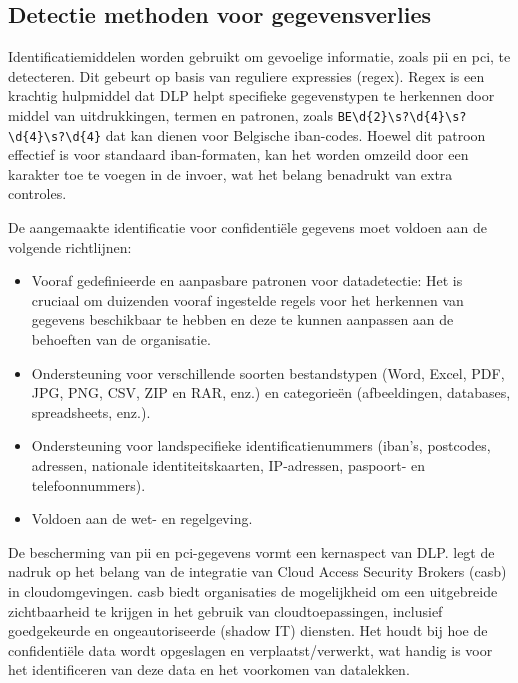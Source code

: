 \subsection{Detectie methoden voor gegevensverlies}

Identificatiemiddelen worden gebruikt om gevoelige informatie, zoals \gls{pii} en \gls{pci}, te detecteren. 
Dit gebeurt op basis van reguliere expressies (regex). 
Regex is een krachtig hulpmiddel dat DLP helpt specifieke gegevenstypen te herkennen door middel van uitdrukkingen, termen en patronen, 
zoals \texttt{BE\textbackslash d\{2\}\textbackslash s?\textbackslash d\{4\}\textbackslash s?\textbackslash d\{4\}\-\textbackslash s?\textbackslash d\{4\}} 
dat kan dienen voor Belgische \gls{iban}-codes. 
Hoewel dit patroon effectief is voor standaard \gls{iban}-formaten, 
kan het worden omzeild door een karakter toe te voegen in de invoer, wat het belang benadrukt van extra controles. 

De aangemaakte identificatie voor confidentiële gegevens moet voldoen aan de volgende richtlijnen:

\begin{itemize}
    \item Vooraf gedefinieerde en aanpasbare patronen voor datadetectie: Het is cruciaal om duizenden vooraf ingestelde regels voor het herkennen van gegevens beschikbaar te hebben en deze te kunnen aanpassen aan de behoeften van de organisatie.
    \item Ondersteuning voor verschillende soorten bestandstypen (Word, Excel, PDF, JPG, PNG, CSV, ZIP en RAR, enz.) en categorieën (afbeeldingen, databases, spreadsheets, enz.).
    \item Ondersteuning voor landspecifieke identificatienummers (\gls{iban}'s, postcodes, adressen, nationale identiteitskaarten, IP-adressen, pas\-poort- en telefoonnummers).
    \item Voldoen aan de wet- en regelgeving.
\end{itemize}

De bescherming van \gls{pii} en \gls{pci}-gegevens vormt een kernaspect van DLP. \textcite{Wason2020CASB} legt de nadruk op het belang van de integratie van Cloud Access Security Brokers (\gls{casb}) in cloudomgevingen. 
\gls{casb} biedt organisaties de mogelijkheid om een uitgebreide zichtbaarheid te krijgen in het gebruik van cloudtoepassingen, inclusief goedgekeurde en ongeautoriseerde (shadow IT) diensten. 
Het houdt bij hoe de confidentiële data wordt opgeslagen en verplaatst/verwerkt, wat handig is voor het identificeren van deze data en het voorkomen van datalekken.

